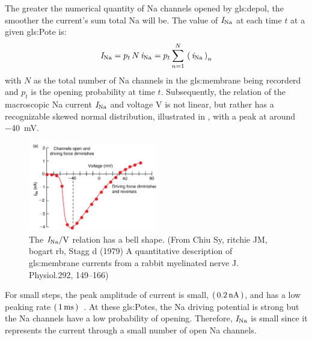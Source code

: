 \documentclass[class={myRUCProject}, crop=false]{standalone}
\begin{document}
The greater the numerical quantity of \gls{Na} channels opened by \gls{gls:depol}, the smoother the current's sum total \gls{Na} will be. 
The value of \(\mathit{I}_\mathrm{Na}\) at each time \(t\) at a given \gls{gls:Pote} is: 
\begin{equation}\label{eq:nasum}
  \mathit{I}_\mathrm{Na} = p_t \, N \, \mathit{i}_\mathrm{Na} = p_t \sum^N_{n=1} \, \left(\,\mathit{i}_\mathrm{Na}\,\right)_n 
\end{equation}
with \(N\) as the total number of \gls{Na} channels in the \gls{gls:membrane} being recorderd and \(p_t\) is the opening probability at time \(t\). 
Subsequently, the relation of the macroscopic \gls{Na} current \(\mathit{I}_\mathrm{Na}\) and voltage \(\unit{\V}\) is not linear, but rather has a recognizable skewed normal distribution, illustrated in , with a peak at around \qty{-40}{\mV}. 
\begin{figure}[H]
  \centering
  \includegraphics[width=0.5\textwidth]{Pictures//Anakin/I-V.bell.png}
  \caption{The \(\curr\sodium/\unit{\V}\) relation has a bell shape. (From Chiu Sy, ritchie JM, bogart rb, Stagg d (1979) A quantitative description of \gls{gls:membrane} currents from a rabbit myelinated nerve J. Physiol.292, 149–166)}\label{fig:IVdist.}
\end{figure}
 
For small steps, the peak amplitude of current is small, \(\left(\,\qty{0.2}{\nano\ampere}\,\right)\), and has a low peaking rate \(\left(\,\qty{1}{\milli\second}\,\right)\)~\cite{Hammond2015ch4}. At these \glspl{gls:Pote}, the \gls{Na} driving potential is strong but the \gls{Na} channels have a low probability of opening. Therefore, \(\mathit{I}_\mathrm{Na}\) is small since it represents the current through a small number of open \gls{Na} channels. 
\end{document}
